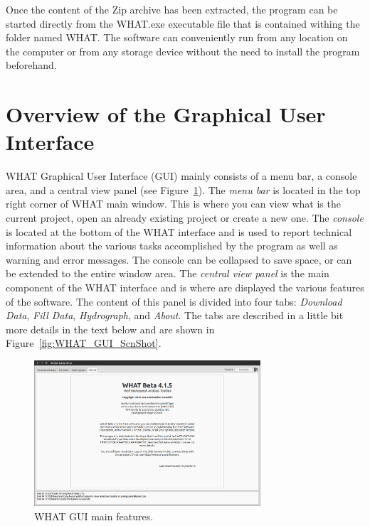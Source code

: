 \documentclass[12pt, letterpaper, fleqn]{report}
\begin{document}
Once the content of the Zip archive has been extracted, the program can be started directly from the WHAT.exe executable file that is contained withing the folder named WHAT. The software can conveniently run from any location on the computer or from any storage device without the need to install the program beforehand.

\section{Overview of the Graphical User Interface}
\label{sec:GUI_overview}


WHAT Graphical User Interface (GUI) mainly consists of a menu bar, a console area, and a central view panel (see Figure~\ref{fig:WHAT_GUI}). The \emph{menu bar} is located in the top right corner of WHAT main window. This is where you can view what is the current project, open an already existing project or create a new one. The \emph{console} is located at the bottom of the WHAT interface and is used to report technical information about the various tasks accomplished by the program as well as warning and error messages. The console can be collapsed to save space, or can be extended to the entire window area. The \emph{central view panel} is the main component of the WHAT interface and is where are displayed the various features of the software. The content of this panel is divided into four tabs: \emph{Download Data}, \emph{Fill Data}, \emph{Hydrograph}, and \emph{About}. The tabs are described in a little bit more details in the text below and are shown in Figure~\ref{fig:WHAT_GUI_ScnShot}.

\begin{figure}[h!]
\centering
\includegraphics[width=0.75\textwidth]{WHAT_GUI}
\caption[WHAT GUI main features.]{WHAT GUI main features.}
\label{fig:WHAT_GUI}
\end{figure}
\end{document}
